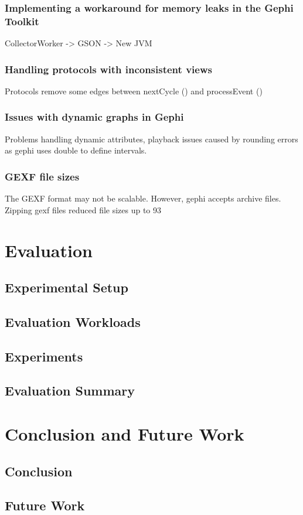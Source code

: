 \documentclass[UKenglish, a4paper]{ifimaster}
\begin{document}
    \subsection{Implementing a workaround for memory leaks in the Gephi Toolkit}
    CollectorWorker -> GSON -> New JVM
    \subsection{Handling protocols with inconsistent views}
    Protocols remove some edges between nextCycle () and processEvent ()
    \subsection{Issues with dynamic graphs in Gephi}
        Problems handling dynamic attributes, playback issues caused by
        rounding errors as gephi uses double to define intervals.
    \subsection{GEXF file sizes}
        The GEXF format may not be scalable. However, gephi accepts
        archive files. Zipping gexf files reduced file sizes up to 93%

\chapter{Evaluation}
\label{ch:evaluation}
    \section{Experimental Setup}
    \section{Evaluation Workloads}
    \section{Experiments}
    \section{Evaluation Summary}

\chapter{Conclusion and Future Work}
\label{ch:conclusion-and-future-work}
    \section{Conclusion}
    \section{Future Work}


\backmatter{}
\printbibliography{}
\end{document}
